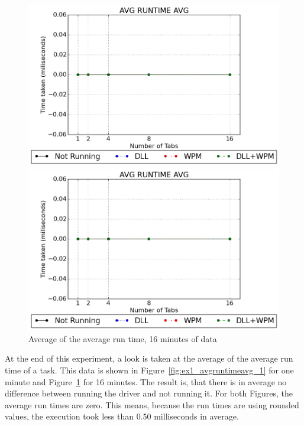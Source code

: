 \begin{figure}[h]
	\centering
    \includegraphics[width=\textwidth,height=0.45\textheight,keepaspectratio]{Evaluation/experiment1/AVG-RUNTIME-AVG-1.png}
    \caption{Average of the average run time, 1 minute of data}
    \label{fig:ex1_avgruntimeavg_1}
    
  	\vspace*{\floatsep}    
    
    \includegraphics[width=\textwidth,height=0.45\textheight,keepaspectratio]{Evaluation/experiment1/AVG-RUNTIME-AVG-16.png}
    \caption{Average of the average run time, 16 minutes of data}
    \label{fig:ex1_avgruntimeavg_16}
\end{figure}
At the end of this experiment, a look is taken at the average of the average run time of a task. This data is shown in Figure~\ref{fig:ex1_avgruntimeavg_1} for one minute and Figure~\ref{fig:ex1_avgruntimeavg_16} for 16 minutes. The result is, that there is in average no difference between running the driver and not running it. For both Figures, the average run times are zero. This means, because the run times are using rounded values, the execution took less than 0.50 milliseconds in average.

